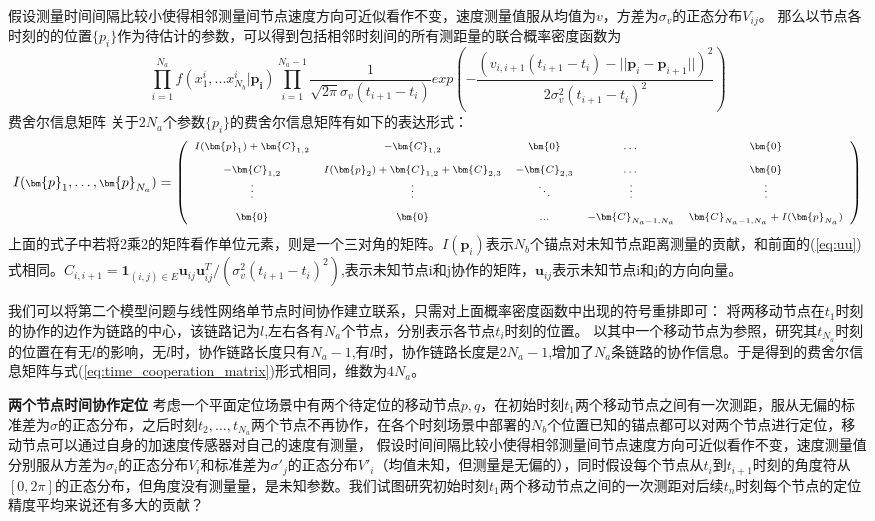 假设测量时间间隔比较小使得相邻测量间节点速度方向可近似看作不变，速度测量值服从均值为$v$，方差为$\sigma_{v}$的正态分布$V_{ij}$。
那么以节点各时刻的的位置$\{p_i\}$作为待估计的参数，可以得到包括相邻时刻间的所有测距量的联合概率密度函数为
\begin{equation}
\prod_{i=1}^{N_a} f(x^i_1,...x^{i}_{N_b}|\bm{p_i})
\prod_{i=1}^{N_a-1}\frac{1}{\sqrt{2\pi}\sigma_v(t_{i+1}-t_i)}
exp(-\frac{(v_{i,i+1}(t_{i+1}-t_i)-||\bm{p}_i-\bm{p}_{i+1}||)^2}{2\sigma_v^2(t_{i+1}-t_i)^2})
\end{equation}
{费舍尔信息矩阵}
关于$2N_a$个参数$\{p_i\}$的费舍尔信息矩阵有如下的表达形式：
\begin{equation}\label{eq:time_cooperation_matrix}
\scriptsize{
I(\bm{p}_1,\dots,\bm{p}_{N_a})=
\left(
\begin{array}{ccccc}
I(\bm{p}_1)+\bm{C}_{1,2}&-\bm{C}_{1,2}&\bm{0}&\dots&\bm{0}\\
&&&&\\
-\bm{C}_{1,2} & I(\bm{p}_2)+\bm{C}_{1,2}+\bm{C}_{2,3}&-\bm{C}_{2,3}&\dots&\bm{0}\\
\vdots &\vdots&\ddots &\vdots&\vdots\\
&&&&\\
\bm{0}&\bm{0}&...& -\bm{C}_{N_a-1,N_a}&\bm{C}_{N_a-1,N_a}+I(\bm{p}_{N_a})\\
\end{array}
\right)
}
\end{equation}
上面的式子中若将2乘2的矩阵看作单位元素，则是一个三对角的矩阵。$I(\bm{p}_i)$表示$N_b$个锚点对未知节点距离测量的贡献，和前面的(\ref{eq:uu})式相同。$C_{i,i+1}=\bm{1}_{(i,j)\in E}\bm{u}_{ij}\bm{u}_{ij}^T/(\sigma_v^2(t_{i+1}-t_i)^2)$,表示未知节点i和j协作的矩阵，$\bm{u}_{ij}$表示未知节点i和j的方向向量。

我们可以将第二个模型问题与线性网络单节点时间协作建立联系，只需对上面概率密度函数中出现的符号重排即可：
将两移动节点在$t_1$时刻的协作的边作为链路的中心，该链路记为$l$,左右各有$N_a$个节点，分别表示各节点$t_i$时刻的位置。
以其中一个移动节点为参照，研究其$t_{N_a}$时刻的位置在有无$l$的影响，无$l$时，协作链路长度只有$N_a-1$,有$l$时，协作链路长度是$2N_a-1$,增加了$N_a$条链路的协作信息。于是得到的费舍尔信息矩阵与式(\ref{eq:time_cooperation_matrix})形式相同，维数为$4N_a$。

\textbf{两个节点时间协作定位}
考虑一个平面定位场景中有两个待定位的移动节点$p,q$，在初始时刻$t_1$两个移动节点之间有一次测距，服从无偏的标准差为$\sigma$的正态分布，之后时刻$t_2,\dots,t_{N_a}$两个节点不再协作，在各个时刻场景中部署的$N_b$个位置已知的锚点都可以对两个节点进行定位，移动节点可以通过自身的加速度传感器对自己的速度有测量，
假设时间间隔比较小使得相邻测量间节点速度方向可近似看作不变，速度测量值分别服从方差为$\sigma_i$的正态分布$V_i$和标准差为$\sigma'_j$的正态分布$V'_i$（均值未知，但测量是无偏的），同时假设每个节点从$t_i$到$t_{i+1}$时刻的角度符从$[0,2\pi]$的正态分布，但角度没有测量量，是未知参数。我们试图研究初始时刻$t_1$两个移动节点之间的一次测距对后续$t_n$时刻每个节点的定位精度平均来说还有多大的贡献？

